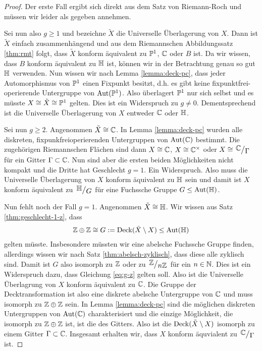 \begin{proof}
  Der erste Fall ergibt sich direkt aus dem Satz von Riemann-Roch
  \cite[Kor. 16.13]{For} und müssen wir leider als gegeben annehmen.

  Sei
  nun also $g \geq 1$ und bezeichne $\tilde X$ die Universelle
  Überlagerung von $X$. Dann ist $\tilde X$ einfach zusammenhängend
  und aus dem Riemannschen Abbildungssatz \ref{thm:rmt} folgt, dass
  $\tilde X$ konform äquivalent zu $\P^1$, $\C$ oder $B$ ist. Da wir
  wissen, dass $B$ konform äquivalent zu $\h$ ist, können wir in der
  Betrachtung genau so gut $\h$ verwenden. Nun wissen wir nach Lemma
  \ref{lemma:deck-pc}, dass jeder Automorphismus von $\P^1$ einen
  Fixpunkt besitzt, d.h. es gibt keine fixpunktfrei-operierende
  Untergruppe von $\Aut(\P^1)$. Also überlagert $\P^1$ nur sich
  selbst und es müsste $X \cong \tilde X \cong \P^1$ gelten. Dies ist
  ein Widerspruch zu $g \neq 0$. Dementsprechend ist die Universelle Überlagerung
  von $X$ entweder $\C$ oder $\h$.

  Sei nun $g \geq 2$. Angenommen $\tilde X \cong \C$. In Lemma
  \ref{lemma:deck-pc} wurden alle diskreten, fixpunkfreioperierenden
  Untergruppen von $\Aut(\C)$ bestimmt. Die zugehörigen Riemannschen
  Flächen sind dann $X \cong \C$, $X \cong \C^\times$ oder $X \cong
  \quot{\C}{\Gamma}$ für ein Gitter $\Gamma \subset \C$. Nun sind aber
  die ersten beiden Möglichkeiten nicht kompakt und die Dritte hat
  Geschlecht $g =1$. Ein Widerspruch. Also muss die Universelle
  Überlagerung von $X$ konform äquivalent zu $\h$ sein und damit ist
  $X$ konform äquivalent zu $\quot{\h}{G}$ für eine Fuchssche Gruppe $G
  \leq \Aut(\h)$.

  Nun fehlt noch der Fall $g = 1$. Angenommen $\tilde X \cong \h$. Wir
  wissen aus Satz \ref{thm:geschlecht-1-z}, dass
  \begin{align}
    \label{eq:g-z}
  \Z \oplus \Z \cong G := \Deck(\tilde X \setminus X) \leq \Aut(\h)
  \end{align}
  gelten müsste. Insbesondere müssten wir eine abelsche Fuchssche
  Gruppe finden, allerdings wissen wir nach Satz
  \ref{thm:abelsch-zyklisch}, dass diese alle zyklisch sind. Damit ist
  $G$ also isomorph zu $\Z$ oder zu $\quot{\Z}{n\Z}$ für ein $n \in
  \N$. Dies ist ein Widerspruch dazu, dass Gleichung \eqref{eq:g-z}
  gelten soll. Also ist die Universelle Überlagrung von $X$ konform
  äquivalent zu $\C$. Die Gruppe der Decktransformation ist also eine
  diskrete abelsche Untergruppe von $\C$ und muss isomorph zu $\Z
  \oplus \Z$ sein. In Lemma \ref{lemma:deck-pc} sind die möglichen diskreten
  Untergruppen von $\Aut(\C)$ charakterisiert und die einzige Möglichkeit, die
  isomorph zu $\Z \oplus \Z$ ist, ist die des Gitters. Also ist die
  $\Deck(\tilde X \setminus X)$ isomorph zu einem Gitter $\Gamma
  \subset \C$. Insgesamt erhalten wir, dass $X$ konform äquvialent zu
  $\quot{\C}{\Gamma}$ ist.
\end{proof}


